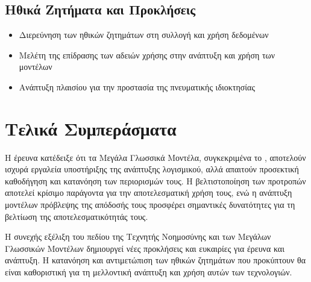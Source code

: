 \subsection*{Ηθικά Ζητήματα και Προκλήσεις}
\begin{itemize}
    \item Διερεύνηση των ηθικών ζητημάτων στη συλλογή και χρήση δεδομένων
    \item Μελέτη της επίδρασης των αδειών χρήσης στην ανάπτυξη και χρήση των μοντέλων
    \item Ανάπτυξη πλαισίου για την προστασία της πνευματικής ιδιοκτησίας
\end{itemize}

\section{Τελικά Συμπεράσματα}

Η έρευνα κατέδειξε ότι τα Μεγάλα Γλωσσικά Μοντέλα, συγκεκριμένα το , αποτελούν ισχυρά εργαλεία υποστήριξης της ανάπτυξης λογισμικού, αλλά απαιτούν προσεκτική καθοδήγηση και κατανόηση των περιορισμών τους. Η βελτιστοποίηση των προτροπών αποτελεί κρίσιμο παράγοντα για την αποτελεσματική χρήση τους, ενώ η ανάπτυξη μοντέλων πρόβλεψης της απόδοσής τους προσφέρει σημαντικές δυνατότητες για τη βελτίωση της αποτελεσματικότητάς τους.

Η συνεχής εξέλιξη του πεδίου της Τεχνητής Νοημοσύνης και των Μεγάλων Γλωσσικών Μοντέλων δημιουργεί νέες προκλήσεις και ευκαιρίες για έρευνα και ανάπτυξη. Η κατανόηση και αντιμετώπιση των ηθικών ζητημάτων που προκύπτουν θα είναι καθοριστική για τη μελλοντική ανάπτυξη και χρήση αυτών των τεχνολογιών.